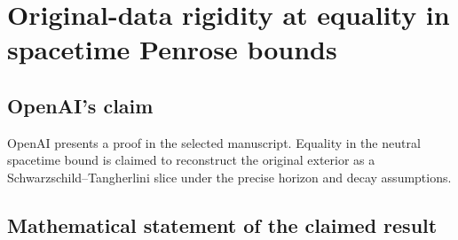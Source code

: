 \documentclass[11pt]{article}
\begin{document}
\section*{Original-data rigidity at equality in spacetime Penrose bounds}

\subsection{OpenAI's claim}
OpenAI presents a proof in the selected manuscript. Equality in the neutral spacetime bound is claimed to reconstruct the original exterior as a Schwarzschild--Tangherlini slice under the precise horizon and decay assumptions.

\subsection{Mathematical statement of the claimed result}
\end{document}

